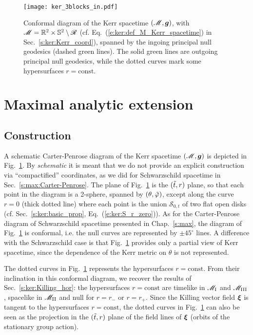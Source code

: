 
\begin{figure}
\centerline{\texttt{[image: ker\_3blocks\_in.pdf]}}
\caption[]{\label{f:ker:3blocks_in} \footnotesize
Conformal diagram of the Kerr spacetime $(\mathscr{M},\bm{g})$, with
$\mathscr{M} = \mathbb{R}^2\times\mathbb{S}^2 \setminus \mathscr{R}$ (cf. Eq.~(\ref{e:ker:def_M_Kerr_spacetime}) in Sec.~\ref{s:ker:Kerr_coord}), spanned by the ingoing principal null geodesics (dashed green lines). The solid green lines are outgoing principal null geodesics, while
the dotted curves mark some hypersurfaces $r=\mathrm{const}$.}
\end{figure}


\section{Maximal analytic extension} \label{s:ker:max_extension}

\subsection{Construction}

A schematic Carter-Penrose diagram of the Kerr spacetime $(\mathscr{M},\bm{g})$ is depicted in
Fig.~\ref{f:ker:3blocks_in}.
By \emph{schematic} it is meant that we do not provide an explicit construction
via ``compactified'' coordinates, as we did for Schwarzschild
spacetime in Sec.~\ref{s:max:Carter-Penrose}. The plane of Fig.~\ref{f:ker:3blocks_in}
is the $({\tilde t},r)$ plane, so that
each point in the diagram is a 2-sphere, spanned by $(\theta,{\tilde\varphi})$, except
along the curve $r=0$ (thick dotted line) where each point is the union $\mathcal{S}_{0,t}$
of two flat open disks (cf. Sec.~\ref{s:ker:basic_prop}, Eq.~(\ref{e:ker:S_r_zero})).
As for the Carter-Penrose diagram of Schwarzschild spacetime presented in
Chap.~\ref{s:max}, the diagram of Fig.~\ref{f:ker:3blocks_in} is conformal, i.e.
the null curves are represented by $\pm 45^\circ$ lines. A difference with the Schwarzschild case
is that Fig.~\ref{f:ker:3blocks_in} provides only a partial view of Kerr spacetime, since
the dependence of the Kerr metric on $\theta$ is not represented.

The dotted curves in Fig.~\ref{f:ker:3blocks_in} represents the hypersurfaces
$r=\mathrm{const}$. From their inclination in this conformal diagram, we recover the results
of Sec.~\ref{s:ker:Killing_hor}: the hypersurfaces $r=\mathrm{const}$ are timelike in
$\mathscr{M}_{\rm I}$ and $\mathscr{M}_{\rm III}$, spacelike in $\mathscr{M}_{\rm II}$ and null for
$r=r_-$ or $r=r_+$. Since the Killing vector field $\bm{\xi}$ is tangent
to the hypersurfaces $r=\mathrm{const}$, the dotted curves in Fig.~\ref{f:ker:3blocks_in}
can also be seen as the projection in the $({\tilde t},r)$ plane of the field lines
of $\bm{\xi}$ (orbits of the stationary group action).

